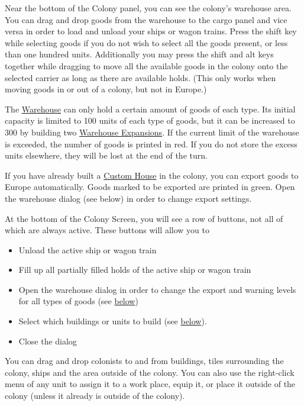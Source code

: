 \documentclass[12pt]{book}
\begin{document}
Near the bottom of the Colony panel, you can see the colony's warehouse
area. You can drag and drop goods from the warehouse to the cargo panel
and vice versa in order to load and unload your ships or wagon trains.
Press the shift key while selecting goods if you do not wish to select
all the goods present, or less than one hundred units. Additionally you
may press the shift and alt keys together while dragging to move all the
available goods in the colony onto the selected carrier as long as there
are available holds. (This only works when moving goods in or out of a
colony, but not in Europe.)

The \hyperlink{Warehouse}{Warehouse} can only hold a certain amount of
goods of each type. Its initial capacity is limited to 100 units of
each type of goods, but it can be increased to 300 by building two
\hyperlink{Warehouse Expansion}{Warehouse Expansions}. If the current
limit of the warehouse is exceeded, the number of goods is printed in
red. If you do not store the excess units elsewhere, they will be lost
at the end of the turn.

If you have already built a \hyperlink{Custom House}{Custom House} in
the colony, you can export goods to Europe automatically. Goods marked
to be exported are printed in green. Open the warehouse dialog (see
below) in order to change export settings.

At the bottom of the Colony Screen, you will see a row of buttons, not
all of which are always active. These buttons will allow you to

\begin{itemize}
\item Unload the active ship or wagon train
\item Fill up all partially filled holds of the active ship or
wagon train
\item Open the warehouse dialog in order to change the export and
  warning levels for all types of goods (see \hyperlink{The Warehouse
    Dialog}{below})
\item Select which buildings or units to build (see \hyperlink{The
  Build Queue Panel}{below}).
\item Close the dialog
\end{itemize}

You can drag and drop colonists to and from buildings, tiles
surrounding the colony, ships and the area outside of the colony. You
can also use the right-click menu of any unit to assign it to a work
place, equip it, or place it outside of the colony (unless it already
is outside of the colony).
\end{document}
